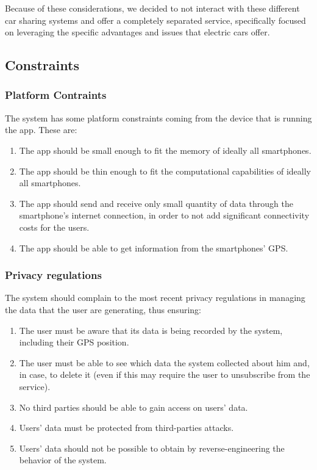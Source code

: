 \documentclass[11pt]{article} %
\begin{document}
Because of these considerations, we decided to not interact with these different car sharing systems and offer a completely separated service, specifically focused on leveraging the specific advantages and issues that electric cars offer.

 
\subsection{Constraints}

	\subsubsection{Platform Contraints}
The system has some platform constraints coming from the device that is running the app. These are:
\begin{enumerate}
	\item The app should be small enough to fit the memory of ideally all smartphones.
	\item The app should be thin enough to fit the computational capabilities of ideally all smartphones.
	\item The app should send and receive only small quantity of data through the smartphone's internet connection, in order to not add significant connectivity costs for the users.
	\item The app should be able to get information from the smartphones' GPS.
  \end{enumerate}

	\subsubsection{Privacy regulations}
The system should complain to the most recent privacy regulations in managing the data that the user are generating, thus ensuring:
\begin{enumerate}
	\item The user must be aware that its data is being recorded by the system, including their GPS position.
	\item The user must be able to see which data the system collected about him and, in case, to delete it (even if this may require the user to unsubscribe from the service).
	\item No third parties should be able to gain access on users' data.
	\item Users' data must be protected from third-parties attacks.
	\item Users' data should not be possible to obtain by reverse-engineering the behavior of the system.
\end{enumerate}
\end{document}

